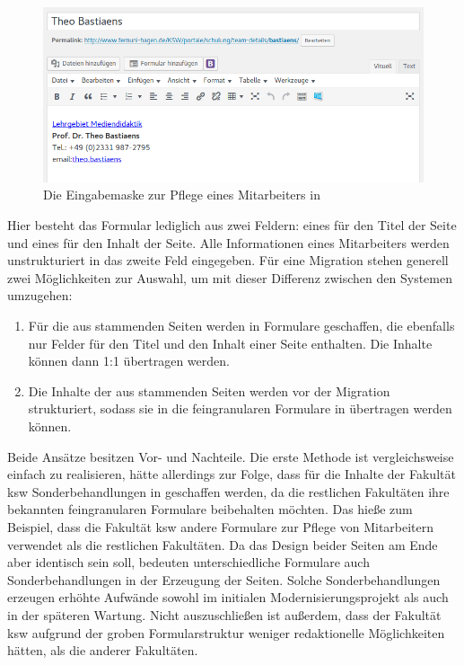         \begin{figure}[htb]
            \centering
            \includegraphics[scale=0.6]{../resources/wordpress/teachers.png}
            \caption{Die Eingabemaske zur Pflege eines Mitarbeiters in {\wordpress}}
            \label{image:introductionFernUniWordpressForm}
        \end{figure}
        
        Hier besteht das Formular lediglich aus zwei Feldern:
        eines für den Titel der Seite und eines für den Inhalt der Seite.
        Alle Informationen eines Mitarbeiters werden unstrukturiert in das zweite Feld eingegeben.
        Für eine Migration stehen generell zwei Möglichkeiten zur Auswahl,
        um mit dieser Differenz zwischen den Systemen umzugehen:

        \begin{enumerate}
            \item   Für die aus {\wordpress} stammenden Seiten werden in {\imperia} Formulare geschaffen,
                    die ebenfalls nur Felder für den Titel und den Inhalt einer Seite enthalten.
                    Die Inhalte können dann 1:1 übertragen werden.
            \item   Die Inhalte der aus {\wordpress} stammenden Seiten werden vor der Migration strukturiert,
                    sodass sie in die feingranularen Formulare in {\imperia} übertragen werden können.
        \end{enumerate}

        Beide Ansätze besitzen Vor- und Nachteile.
        Die erste Methode ist vergleichsweise einfach zu realisieren,
        hätte allerdings zur Folge, dass für die Inhalte der Fakultät \gls{ksw} Sonderbehandlungen
        in {\imperia} geschaffen werden, da die restlichen Fakultäten ihre bekannten feingranularen
        Formulare beibehalten möchten.
        Das hieße zum Beispiel, dass die Fakultät \gls{ksw} andere Formulare zur Pflege von Mitarbeitern
        verwendet als die restlichen Fakultäten.
        Da das Design beider Seiten am Ende aber identisch sein soll, bedeuten unterschiedliche Formulare
        auch Sonderbehandlungen in der Erzeugung der Seiten.
        Solche Sonderbehandlungen erzeugen erhöhte Aufwände sowohl im initialen Modernisierungsprojekt
        als auch in der späteren Wartung.
        Nicht auszuschließen ist außerdem, dass {\editors} der Fakultät \gls{ksw} aufgrund der groben Formularstruktur
        weniger redaktionelle Möglichkeiten hätten, als die anderer Fakultäten.

